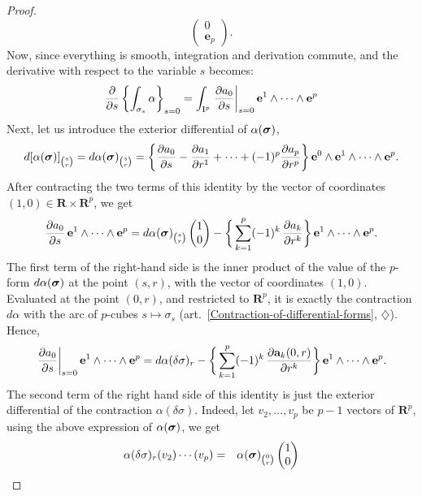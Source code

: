 \documentclass[11pt,reqno]{amsart}
\theoremstyle{definition}
\renewcommand{\over}{\above .2pt}
\newcommand{\RR}{{\mathbf R}}
\renewcommand{\aa}{{\mathbf a}}
\newcommand{\ee}{{\mathbf e}}
\newcommand{\bsigma}{\mbox{\boldmath $\sigma$}}
\newcommand{\xart}[2]{{(art.~\ref{#1}, #2)}}
\newcommand{\cub}[1]{{\rm I}^{#1}}
\newcommand{\Der}{\partial}
\begin{document}
\begin{proof}
$$      \begin{pmatrix}0\\ \ee_p\end{pmatrix}.
      $$
    Now, since everything
    is smooth, integration and derivation commute, and the derivative
    with respect to the variable $s$ becomes: 
    $$ 
      {\Der \over \Der s} \left\{\int_{\sigma_s}\alpha\right\}_{s = 0}
      = \int_{\cub{p}} \left. {\Der a_0 \over \Der
      s}\right|_{s=0} \ee^1\wedge\cdots  \wedge \ee^p 
      $$
    Next, let us introduce the exterior differential of $\alpha(\bsigma)$,
    $$
      d[\alpha(\bsigma)]_{s \choose r} =
      d\alpha(\bsigma)_{s \choose r} = \bigg\{
      {\Der a_0 \over \Der s} - {\Der a_1 \over \Der r^1} +
      \cdots + (-1)^p{\Der a_p \over \Der r^p} \bigg\}\, \ee^0
      \wedge \ee^1 \wedge \cdots \wedge \ee^p.
      $$
    After contracting the two terms of this identity by
    the vector of coordinates $(1,0) \in \RR \times \RR^p$, we
    get
    $$
      {\Der a_0 \over \Der s}\, \ee^1\wedge\cdots \wedge \ee^p 
      = 
      d\alpha(\bsigma)_{s \choose r} \begin{pmatrix}1 \\ 0\end{pmatrix} - 
      \bigg\{ \sum_{k = 1}^p (-1)^k \,{\Der a_k \over
      \Der r^k} \bigg\}  \, \ee^1 \wedge \cdots \wedge \ee^p.
      $$
    The first term of the right-hand side is the
    inner product of the value of the
    $p$-form $d\alpha(\bsigma)$ at the point $(s,r)$, with the
    vector of coordinates $(1, 0)$. Evaluated at the point
    $(0,r)$, and restricted to $\RR^p$, it is exactly the
    contraction $d\alpha$ with the arc of $p$-cubes $s
      \mapsto \sigma_s$
    \xart{Contraction-of-differential-forms}{$\diamondsuit$}.
    Hence,
    $$
      \left. {\Der a_0 \over \Der s}\right|_{s=0}
      \ee^1\wedge\cdots \wedge \ee^p  = 
      d\alpha(\delta\sigma)_r - \bigg\{ \sum_{k = 1}^p (-1)^k
      \,{\Der \aa_k(0,r) \over \Der r^k} \bigg\}  \,
      \ee^1 \wedge \cdots \wedge \ee^p. 
      $$
    The second term of the right hand side of this identity is just the
		exterior differential of the contraction 
    $\alpha(\delta \sigma)$. Indeed, let $v_2, \ldots, v_p$ be  $p-1$ vectors
    of $\RR^p$, using the above expression of
		$\alpha(\bsigma)$, we get  
		\begin{eqnarray*}
			\alpha(\delta \sigma)_r(v_2)\cdots(v_p) &=&
			\alpha(\bsigma)_{0 \choose r} \begin{pmatrix} 1 \\ 0\end{pmatrix} 

\end{eqnarray*}
\end{proof}
\end{document}
